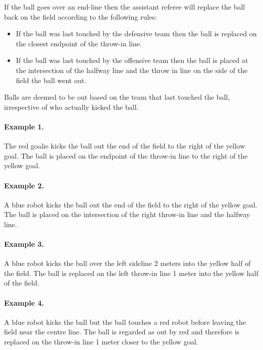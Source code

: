\documentclass[12pt]{article}
\begin{document}
If the ball goes over an end-line then the assistant referee will replace the ball back on the field according to the following rules:

\begin{itemize}

\item If the ball was last touched by the defensive team then the ball is replaced on the closest endpoint of the throw-in line.

\item If the ball was last touched by the offensive team then the ball is placed at the intersection of the halfway line and the throw in line on the side of the field the ball went out.

\end{itemize}

Balls are deemed to be out based on the team that last touched the ball, irrespective of who actually kicked the ball.

\paragraph{Example 1.} The red goalie kicks the ball out the end of the field to the right of the yellow goal. The ball is placed on the endpoint of the throw-in line to the right of the yellow goal.

\paragraph{Example 2.} A blue robot kicks the ball out the end of the field to the right of the yellow goal. The ball is placed on the intersection of the right throw-in line and the halfway line.

\paragraph{Example 3.} A blue robot kicks the ball over the left sideline 2 meters into the yellow half of the field. The ball is replaced on the left throw-in line 1 meter into the yellow half of the field.

\paragraph{Example 4.} A blue robot kicks the ball but the ball touches a red robot before leaving the field near the centre line. The ball is regarded as out by red and therefore is replaced on the throw-in line 1 meter closer to the yellow goal.
\end{document}
